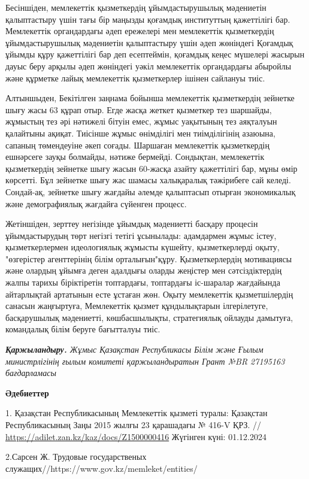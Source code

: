 Бесіншіден, мемлекеттік қызметкердің ұйымдастырушылық мәдениетін
қалыптастыру үшін тағы бір маңызды қоғамдық институттың қажеттілігі бар.
Мемлекеттік органдардағы әдеп ережелері мен мемлекеттік қызметкердің
ұйымдастырушылық мәдениетін қалыптастыру үшін әдеп жөніндегі Қоғамдық
ұйымды құру қажеттілігі бар деп есептеймін, қоғамдық кеңес мүшелері
жасырын дауыс беру арқылы әдеп жөніндегі уәкіл мемлекеттік органдардағы
абыройлы және құрметке лайық мемлекеттік қызметкерлер ішінен сайлануы
тиіс.

Алтыншыден, Бекітілген заңнама бойынша мемлекеттік қызметкердің зейнетке
шығу жасы 63 құрап отыр. Егде жасқа жеткет қызметкер тез шаршайды,
жұмыстың тез әрі нәтижелі бітуін емес, жұмыс уақытының тез аяқталуын
қалайтыны ақиқат. Тиісінше жұмыс өнімділігі мен тиімділігінің азаюына,
сапаның төмендеуіне әкеп соғады. Шаршаған мемлекеттік қызметкердің
ешнәрсеге зауқы болмайды, нәтиже бермейді. Сондықтан, мемлекеттік
қызметкердің зейнетке шығу жасын 60-жасқа азайту қажеттілігі бар, мұны
өмір көрсетті. Бұл зейнетке шығу жас шамасы халықаралық тәжірибеге сай
келеді. Сондай-ақ, зейнетке шығу жағдайы әлемде қалыптасып отырған
экономикалық және демографиялық жағдайға сүйенген процесс.

Жетіншіден, зерттеу негізінде ұйымдық мәдениетті басқару процесін
ұйымдастырудың төрт негізгі тетігі ұсынылады: адамдармен жұмыс істеу,
қызметкерлермен идеологиялық жұмысты күшейту, қызметкерлерді оқыту,
"өзгерістер агенттерінің білім орталығын"құру. Қызметкерлердің
мотивациясы және олардың ұйымға деген адалдығы оларды жеңістер мен
сәтсіздіктердің жалпы тарихы біріктіретін топтардағы, топтардағы
іс-шаралар жағдайында айтарлықтай артатынын есте ұстаған жөн. Оқыту
мемлекеттік қызметшілердің санасын жаңғыртуға, Мемлекеттік қызмет
құндылықтарын ілгерілетуге, басқарушылық мәдениетті, көшбасшылықты,
стратегиялық ойлауды дамытуға, командалық білім беруге бағытталуы тиіс.

\emph{{\bfseries Қаржыландыру.} Жұмыс Қазақстан Республикасы Білім және
Ғылым министрлігінің ғылым комитеті қаржыландыратын Грант №BR 27195163
бағдарламасы}

{\bfseries Әдебиеттер}

1. Қазақстан Республикасының Мемлекеттік қызметі туралы: Қазақстан
Республикасының Заңы 2015 жылғы 23 қарашадағы № 416-V ҚРЗ. //
\url{https://adilet.zan.kz/kaz/docs/Z1500000416} Жүгінген күні:
01.12.2024

2.Сарсен Ж. Трудовые государственых
служащих//https://www.gov.kz/memleket/entities/

